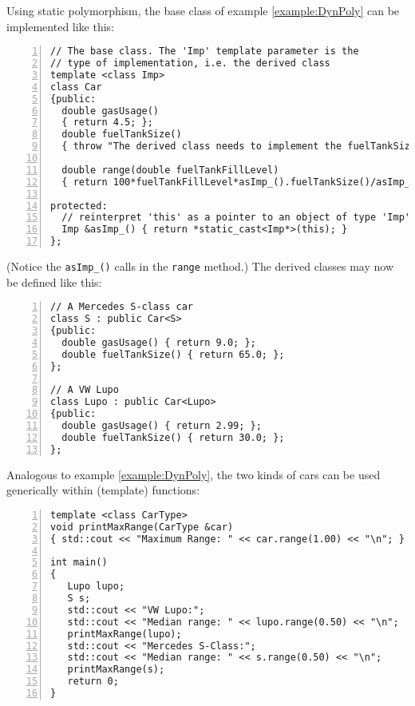 \begin{example}
  Using static polymorphism, the base class of example \ref{example:DynPoly}
  can be implemented like this:
\begin{lstlisting}[name=staticcars,basicstyle=\ttfamily\scriptsize,numbers=left,numberstyle=\tiny, numbersep=5pt]
// The base class. The 'Imp' template parameter is the
// type of implementation, i.e. the derived class
template <class Imp>
class Car
{public:
  double gasUsage()
  { return 4.5; };
  double fuelTankSize()
  { throw "The derived class needs to implement the fuelTankSize() method"; };

  double range(double fuelTankFillLevel)
  { return 100*fuelTankFillLevel*asImp_().fuelTankSize()/asImp_().gasUsage(); }

protected:
  // reinterpret 'this' as a pointer to an object of type 'Imp'
  Imp &asImp_() { return *static_cast<Imp*>(this); }
};
\end{lstlisting}
(Notice the \texttt{asImp\_()} calls in the \texttt{range} method.) The
derived classes may now be defined like this:
\begin{lstlisting}[name=staticcars,basicstyle=\ttfamily\scriptsize,numbers=left,numberstyle=\tiny, numbersep=5pt]
// A Mercedes S-class car
class S : public Car<S>
{public:
  double gasUsage() { return 9.0; };
  double fuelTankSize() { return 65.0; };
};

// A VW Lupo
class Lupo : public Car<Lupo>
{public:
  double gasUsage() { return 2.99; };
  double fuelTankSize() { return 30.0; };
};
\end{lstlisting}
\end{example}

\noindent
Analogous to example \ref{example:DynPoly}, the two kinds of cars can
be used generically within (template) functions:
\begin{lstlisting}[name=staticcars,basicstyle=\ttfamily\scriptsize,numbers=left,numberstyle=\tiny, numbersep=5pt]
template <class CarType>
void printMaxRange(CarType &car)
{ std::cout << "Maximum Range: " << car.range(1.00) << "\n"; }

int main()
{
   Lupo lupo;
   S s;
   std::cout << "VW Lupo:";
   std::cout << "Median range: " << lupo.range(0.50) << "\n";
   printMaxRange(lupo);
   std::cout << "Mercedes S-Class:";
   std::cout << "Median range: " << s.range(0.50) << "\n";
   printMaxRange(s);
   return 0;
}
\end{lstlisting}


